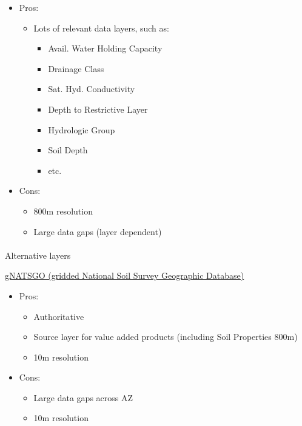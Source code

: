 \documentclass[
]{agujournal2019}
\makeatletter
\let\oldparagraph\paragraph
\renewcommand{\paragraph}{
    \@ifstar
      \xxxParagraphStar
      \xxxParagraphNoStar
  }
\newcommand{\xxxParagraphStar}[1]{\oldparagraph*{#1}\mbox{}}
\newcommand{\xxxParagraphNoStar}[1]{\oldparagraph{#1}\mbox{}}
\providecommand{\tightlist}{%
  \setlength{\itemsep}{0pt}\setlength{\parskip}{0pt}}
\makeatother
\begin{document}
\begin{itemize}
\tightlist
\item
  Pros:

  \begin{itemize}
  \tightlist
  \item
    Lots of relevant data layers, such as:

    \begin{itemize}
    \tightlist
    \item
      Avail. Water Holding Capacity
    \item
      Drainage Class
    \item
      Sat. Hyd. Conductivity
    \item
      Depth to Restrictive Layer
    \item
      Hydrologic Group
    \item
      Soil Depth
    \item
      etc.
    \end{itemize}
  \end{itemize}
\item
  Cons:

  \begin{itemize}
  \tightlist
  \item
    800m resolution
  \item
    Large data gaps (layer dependent)
  \end{itemize}
\end{itemize}

\paragraph{Alternative layers}\label{alternative-layers}

\href{https://gee-community-catalog.org/projects/gnatsgo/}{gNATSGO
(gridded National Soil Survey Geographic Database)}

\begin{itemize}
\tightlist
\item
  Pros:

  \begin{itemize}
  \tightlist
  \item
    Authoritative
  \item
    Source layer for value added products (including Soil Properties
    800m)
  \item
    10m resolution
  \end{itemize}
\item
  Cons:

  \begin{itemize}
  \tightlist
  \item
    Large data gaps across AZ
  \item
    10m resolution
  \end{itemize}
\end{itemize}
\end{document}

